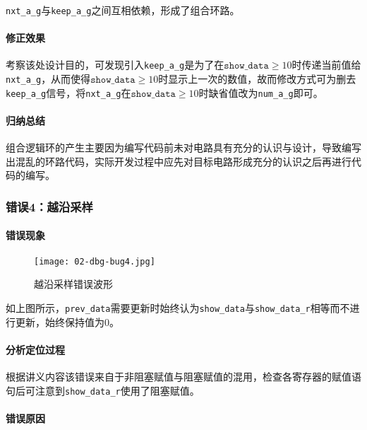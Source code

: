 \documentclass[UTF-8,twoside,c5size]{ctexart}
\begin{document}
	\texttt{nxt\_a\_g}与\texttt{keep\_a\_g}之间互相依赖，形成了组合环路。
	
	\paragraph{修正效果}\hfill
	
	考察该处设计目的，可发现引入\texttt{keep\_a\_g}是为了在$ \texttt{show\_data}\geqslant 10 $时传递当前值给\texttt{nxt\_a\_g}，从而使得$ \texttt{show\_data}\geqslant 10 $时显示上一次的数值，故而修改方式可为删去\texttt{keep\_a\_g}信号，将\texttt{nxt\_a\_g}在$ \texttt{show\_data}\geqslant 10 $时缺省值改为\texttt{num\_a\_g}即可。
	
	\paragraph{归纳总结}\hfill
	
	组合逻辑环的产生主要因为编写代码前未对电路具有充分的认识与设计，导致编写出混乱的环路代码，实际开发过程中应先对目标电路形成充分的认识之后再进行代码的编写。
	
	\subsubsection{错误4：越沿采样}
	\paragraph{错误现象}\hfill
	
	\begin{figure}[!h]
		\centering
		\texttt{[image: 02-dbg-bug4.jpg]}
		\caption{越沿采样错误波形}
	\end{figure}

	如上图所示，\texttt{prev\_data}需要更新时始终认为\texttt{show\_data}与\texttt{show\_data\_r}相等而不进行更新，始终保持值为0。
	
	\paragraph{分析定位过程}\hfill
	
	根据讲义内容该错误来自于非阻塞赋值与阻塞赋值的混用，检查各寄存器的赋值语句后可注意到\texttt{show\_data\_r}使用了阻塞赋值。
	
	\paragraph{错误原因}\hfill
	
\end{document}
